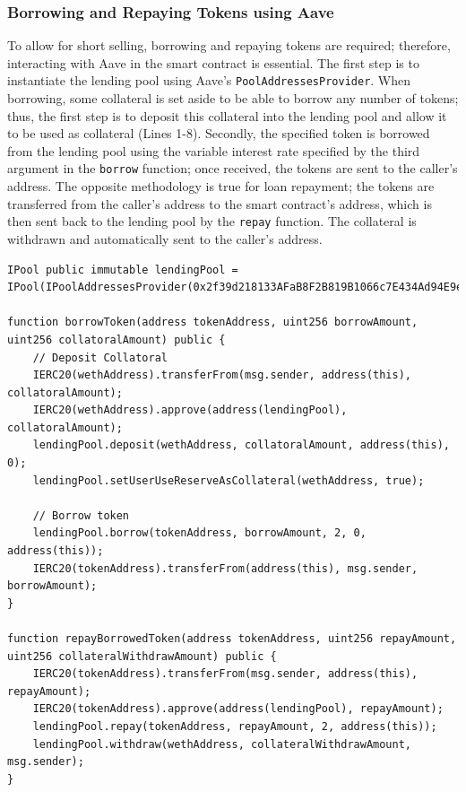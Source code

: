 \subsubsection{Borrowing and Repaying Tokens using Aave}
To allow for short selling, borrowing and repaying tokens are required; therefore, interacting with Aave in the smart contract is essential. The first step is to instantiate the lending pool using Aave's \texttt{PoolAddressesProvider}. When borrowing, some collateral is set aside to be able to borrow any number of tokens; thus, the first step is to deposit this collateral into the lending pool and allow it to be used as collateral (Lines 1-8). Secondly, the specified token is borrowed from the lending pool using the variable interest rate specified by the third argument in the \texttt{borrow} function; once received, the tokens are sent to the caller's address. The opposite methodology is true for loan repayment; the tokens are transferred from the caller's address to the smart contract's address, which is then sent back to the lending pool by the \texttt{repay} function. The collateral is withdrawn and automatically sent to the caller's address.
\begin{lstlisting}[language=Solidity]
IPool public immutable lendingPool = IPool(IPoolAddressesProvider(0x2f39d218133AFaB8F2B819B1066c7E434Ad94E9e).getPool());

function borrowToken(address tokenAddress, uint256 borrowAmount, uint256 collatoralAmount) public {
    // Deposit Collatoral
    IERC20(wethAddress).transferFrom(msg.sender, address(this), collatoralAmount);
    IERC20(wethAddress).approve(address(lendingPool), collatoralAmount);
    lendingPool.deposit(wethAddress, collatoralAmount, address(this), 0);
    lendingPool.setUserUseReserveAsCollateral(wethAddress, true);

    // Borrow token
    lendingPool.borrow(tokenAddress, borrowAmount, 2, 0, address(this));
    IERC20(tokenAddress).transferFrom(address(this), msg.sender, borrowAmount);
}

function repayBorrowedToken(address tokenAddress, uint256 repayAmount, uint256 collateralWithdrawAmount) public {
    IERC20(tokenAddress).transferFrom(msg.sender, address(this), repayAmount);
    IERC20(tokenAddress).approve(address(lendingPool), repayAmount);
    lendingPool.repay(tokenAddress, repayAmount, 2, address(this));
    lendingPool.withdraw(wethAddress, collateralWithdrawAmount, msg.sender);
}
\end{lstlisting}

